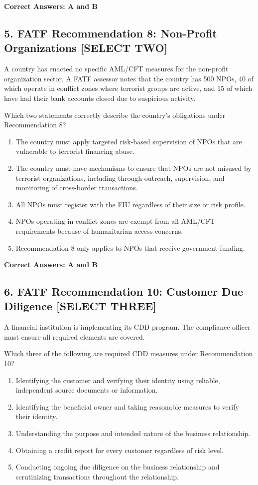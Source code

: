 \documentclass[11pt,a4paper]{article}
\begin{document}
	\textbf{Correct Answers: A and B}
	
	\subsection{5. FATF Recommendation 8: Non-Profit Organizations \textnormal{[SELECT TWO]}}
	
	A country has enacted no specific AML/CFT measures for the non-profit organization sector. A FATF assessor notes that the country has 500 NPOs, 40 of which operate in conflict zones where terrorist groups are active, and 15 of which have had their bank accounts closed due to suspicious activity.
	
	Which two statements correctly describe the country's obligations under Recommendation 8?
	
	\begin{enumerate}[label=\Alph*.]
		\item The country must apply targeted risk-based supervision of NPOs that are vulnerable to terrorist financing abuse.
		\item The country must have mechanisms to ensure that NPOs are not misused by terrorist organizations, including through outreach, supervision, and monitoring of cross-border transactions.
		\item All NPOs must register with the FIU regardless of their size or risk profile.
		\item NPOs operating in conflict zones are exempt from all AML/CFT requirements because of humanitarian access concerns.
		\item Recommendation 8 only applies to NPOs that receive government funding.
	\end{enumerate}
	
	\textbf{Correct Answers: A and B}
	
	\subsection{6. FATF Recommendation 10: Customer Due Diligence \textnormal{[SELECT THREE]}}
	
	A financial institution is implementing its CDD program. The compliance officer must ensure all required elements are covered.
	
	Which three of the following are required CDD measures under Recommendation 10?
	
	\begin{enumerate}[label=\Alph*.]
		\item Identifying the customer and verifying their identity using reliable, independent source documents or information.
		\item Identifying the beneficial owner and taking reasonable measures to verify their identity.
		\item Understanding the purpose and intended nature of the business relationship.
		\item Obtaining a credit report for every customer regardless of risk level.
		\item Conducting ongoing due diligence on the business relationship and scrutinizing transactions throughout the relationship.
	\end{enumerate}
	
\end{document}
